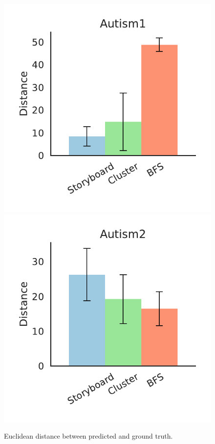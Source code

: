 \begin{figure}[bht]
\includegraphics[scale=0.4]{figures/Autism1.pdf}
\includegraphics[scale=0.4]{figures/Autism2.pdf}
\caption{Euclidean distance between predicted and ground truth.}
\end{figure}
